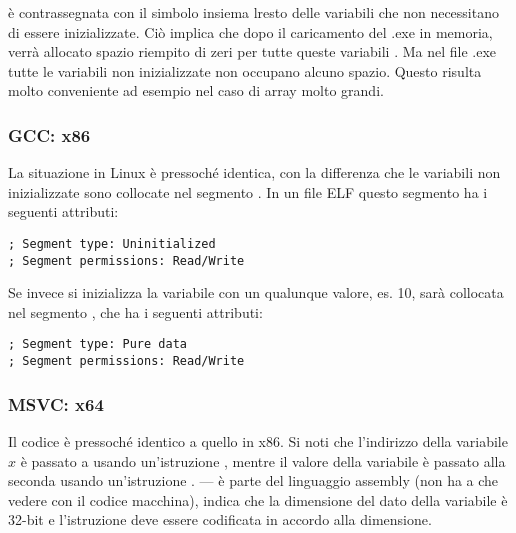  è contrassegnata con il simbolo  insiema lresto delle variabili che non necessitano di essere inizializzate.
Ciò implica che dopo il caricamento del .exe in memoria, verrà allocato spazio riempito di zeri per tutte queste variabili .
Ma nel file .exe tutte le variabili non inizializzate non occupano alcuno spazio.
Questo risulta molto conveniente ad esempio nel caso di array molto grandi.



\subsubsection{GCC: x86}

La situazione in Linux è pressoché identica, con la differenza che le variabili non inizializzate sono collocate nel segmento . 
In un file \ac{ELF} questo segmento ha i seguenti attributi:

\begin{lstlisting}
; Segment type: Uninitialized
; Segment permissions: Read/Write
\end{lstlisting}

Se invece si inizializza la variabile con un qualunque valore, es. 10, 
sarà collocata nel segmento , che ha i seguenti attributi:

\begin{lstlisting}
; Segment type: Pure data
; Segment permissions: Read/Write
\end{lstlisting}

\subsubsection{MSVC: x64}



Il codice è pressoché identico a quello in x86.
Si noti che l'indirizzo della variabile $x$ è passato a  usando un'istruzione \LEA ,
mentre il valore della variabile è passato alla seconda \printf usando un'istruzione \MOV.
--- è parte del linguaggio assembly (non ha a che vedere con il codice macchina),
indica che la dimensione del dato della variabile è 32-bit e l'istruzione \MOV deve essere codificata in accordo alla dimensione.

